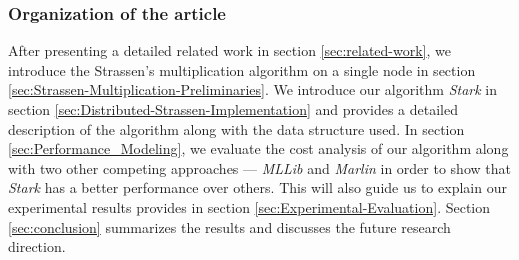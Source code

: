 
\subsubsection{Organization of the article}
After presenting a detailed related work in section \ref{sec:related-work}, we introduce the Strassen's multiplication algorithm on a single node in section \ref{sec:Strassen-Multiplication-Preliminaries}. We introduce our algorithm \textit{Stark} in section \ref{sec:Distributed-Strassen-Implementation} and provides a detailed description of the algorithm along with the data structure used. In section \ref{sec:Performance_Modeling}, we evaluate the cost analysis of our algorithm along with two other competing approaches --- \textit{MLLib} and \textit{Marlin} in order to show that \textit{Stark} has a better performance over others. This will also guide us to explain our experimental results provides in section \ref{sec:Experimental-Evaluation}. Section \ref{sec:conclusion} summarizes the results and discusses the future research direction.

